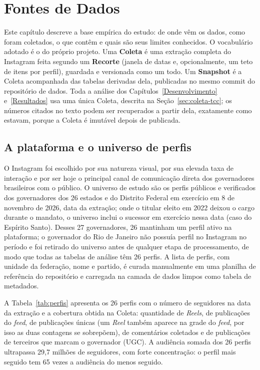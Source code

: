 \chapter{Fontes de Dados}\label{FontesDados}

Este capítulo descreve a base empírica do estudo: de onde vêm os dados, como foram coletados, o que contêm e quais são seus limites conhecidos. O vocabulário adotado é o do próprio projeto. Uma \textbf{Coleta} é uma extração completa do Instagram feita segundo um \textbf{Recorte} (janela de datas e, opcionalmente, um teto de itens por perfil), guardada e versionada como um todo. Um \textbf{Snapshot} é a Coleta acompanhada das tabelas derivadas dela, publicadas no mesmo commit do repositório de dados. Toda a análise dos Capítulos~\ref{Desenvolvimento} e~\ref{Resultados} usa uma única Coleta, descrita na Seção~\ref{sec:coleta-tcc}; os números citados no texto podem ser recuperados a partir dela, exatamente como estavam, porque a Coleta é imutável depois de publicada.

\section{A plataforma e o universo de perfis}

O Instagram foi escolhido por sua natureza visual, por sua elevada taxa de interação e por ser hoje o principal canal de comunicação direta dos governadores brasileiros com o público. O universo de estudo são os perfis públicos e verificados dos governadores dos 26 estados e do Distrito Federal em exercício em 8 de novembro de 2026, data da extração; onde o titular eleito em 2022 deixou o cargo durante o mandato, o universo inclui o sucessor em exercício nessa data (caso do Espírito Santo). Desses 27 governadores, 26 mantinham um perfil ativo na plataforma; o governador do Rio de Janeiro não possuía perfil no Instagram no período e foi retirado do universo antes de qualquer etapa de processamento, de modo que todas as tabelas de análise têm 26 perfis. A lista de perfis, com unidade da federação, nome e partido, é curada manualmente em uma planilha de referência do repositório e carregada na camada de dados limpos como tabela de metadados.

A Tabela~\ref{tab:perfis} apresenta os 26 perfis com o número de seguidores na data da extração e a cobertura obtida na Coleta: quantidade de \emph{Reels}, de publicações do \emph{feed}, de publicações únicas (um \emph{Reel} também aparece na grade do \emph{feed}, por isso as duas contagens se sobrepõem), de comentários coletados e de publicações de terceiros que marcam o governador (UGC). A audiência somada dos 26 perfis ultrapassa 29,7 milhões de seguidores, com forte concentração: o perfil mais seguido tem 65 vezes a audiência do menos seguido.

